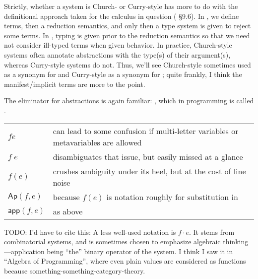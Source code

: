 \documentclass[11pt]{article} %
\theoremstyle{definition}
\theoremstyle{remark}
\begin{document}
Strictly, whether a system is Church- or Curry-style has more to do with the definitional approach taken for the calculus in question (\cite{tapl} \S9.6).
In , we define terms, then a reduction semantics, and only then a type system is given to reject some terms.
In , typing is given prior to the reduction semantics so that we need not consider ill-typed terms when given behavior.
In practice, Church-style systems often annotate abstractions with the type(s) of their argument(s), whereas Curry-style systems do not.
Thus, we'll see Church-style sometimes used as a synonym for  and Curry-style as a synonym for ; quite frankly, I think the manifest/implicit terms are more to the point.

The eliminator for abstractions is again familiar: , which in programming is called .
\begin{center}
\renewcommand{\arraystretch}{1.2}
\begin{tabular}{lp{10cm}}
$fe$ & can lead to some confusion if multi-letter variables or metavariables are allowed \\
$f\;e$ & disambiguates that issue, but easily missed at a glance \\
$f(e)$ & crushes ambiguity under its heel, but at the cost of line noise \\
$\mathsf{Ap}(f, e)$ & because $f(e)$ is notation roughly for substitution in \cite{martin-lof_1984} \\
$\mathsf{app}(f, e)$ & as above \cite{awodey-etal_2012} \\
\end{tabular}
\end{center}
TODO: I'd have to cite this:
  A less well-used notation is $f \cdot e$.
  It stems from combinatorial systems, and is sometimes chosen to emphasize algebraic thinking---application being ``the'' binary operator of the system.
  I think I saw it in ``Algebra of Programming'', where even plain values are considered as functions because something-something-category-theory.
\end{document}
